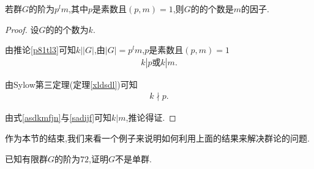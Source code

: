 \begin{corollary}\label{p82tl}
    若群$G$的阶为$p^lm$,其中$p$是素数且$(p,m)=1$,则$G$的的个数是$m$的因子.
\end{corollary}
\begin{proof}
    设$G$的的个数为$k$.

    由推论\ref{p81tl3}可知$k\Big||G|$,由$|G|=p^lm$,$p$是素数且$(p,m)=1$\begin{align}\label{asdkmfjn}
        k|p\text{或}k|m.
    \end{align}

    由Sylow第三定理(定理\ref{xldsdl})可知\begin{align}\label{sadijf}
        k\nmid p.
    \end{align}

    由式\eqref{asdkmfjn}与\eqref{sadijf}可知$k|m$,推论得证.
\end{proof}
作为本节的结束,我们来看一个例子来说明如何利用上面的结果来解决群论的问题.
\begin{example}\label{nvkkadv}
    已知有限群$G$的阶为$72$,证明$G$不是单群.
\end{example}
